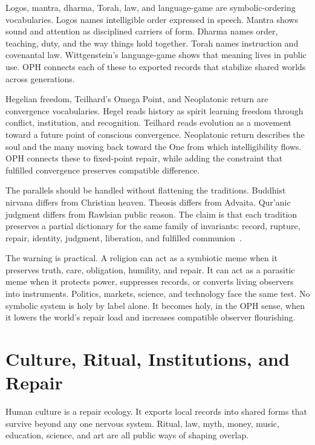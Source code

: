 \documentclass[11pt]{article}
\theoremstyle{remark}
\theoremstyle{plain}
\begin{document}
Logos, mantra, dharma, Torah, law, and language-game are symbolic-ordering
vocabularies. Logos names intelligible order expressed in speech. Mantra shows
sound and attention as disciplined carriers of form. Dharma names order,
teaching, duty, and the way things hold together. Torah names instruction and
covenantal law. Wittgenstein's language-game shows that meaning lives in public
use. OPH connects each of these to exported records that stabilize shared worlds
across generations.

Hegelian freedom, Teilhard's Omega Point, and Neoplatonic return are convergence
vocabularies. Hegel reads history as spirit learning freedom through conflict,
institution, and recognition. Teilhard reads evolution as a movement toward a
future point of conscious convergence. Neoplatonic return describes the soul and
the many moving back toward the One from which intelligibility flows. OPH
connects these to fixed-point repair, while adding the constraint that fulfilled
convergence preserves compatible difference.

The parallels should be handled without flattening the traditions. Buddhist
nirvana differs from Christian heaven. Theosis differs from Advaita. Qur'anic
judgment differs from Rawlsian public reason. The claim is that each
tradition preserves a partial dictionary for the same family of invariants:
record, rupture, repair, identity, judgment, liberation, and fulfilled
communion~\cite{Bible,Quran,BhagavadGita,Rahula1959,CCCHeaven,Lossky1957,BoethiusConsolation,Whitehead1929,Teilhard1955,Hegel1837}.

The warning is practical. A religion can act as a symbiotic meme when it
preserves truth, care, obligation, humility, and repair. It can act as a
parasitic meme when it protects power, suppresses records, or converts living
observers into instruments. Politics, markets, science, and technology face the
same test. No symbolic system is holy by label alone. It becomes holy, in the
OPH sense, when it lowers the world's repair load and increases compatible
observer flourishing.

\section{Culture, Ritual, Institutions, and Repair}

Human culture is a repair ecology. It exports local records into shared forms
that survive beyond any one nervous system. Ritual, law, myth, money, music,
education, science, and art are all public ways of shaping overlap.
\end{document}
